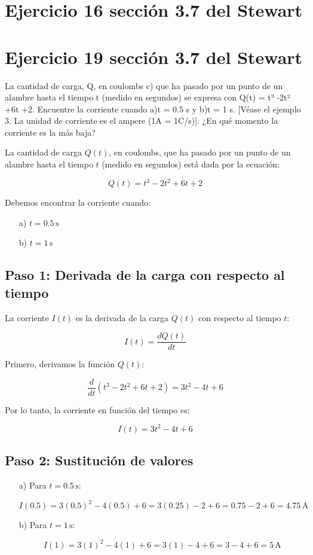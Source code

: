 \documentclass[11pt,letterpaper]{article}
\begin{document}
\section*{Ejercicio 16 sección 3.7 del Stewart}
\section*{Ejercicio 19 sección 3.7 del Stewart}
La cantidad de carga, Q, en coulombs c) que ha pasado por un punto de un alambre hasta el tiempo t (medido en segundos) se expresa con Q(t) = t³ -2t² +6t +2. Encuentre la corriente cuando a)t = 0.5 s y b)t = 1 s. [Véase el ejemplo 3. La unidad de corriente es el ampere
(1A = 1C/s)]. ¿En qué momento la corriente es la más baja?

La cantidad de carga \( Q(t) \), en coulombs, que ha pasado por un punto de un alambre hasta el tiempo \( t \) (medido en segundos) está dada por la ecuación:

\[
Q(t) = t^3 - 2t^2 + 6t + 2
\]

Debemos encontrar la corriente cuando:

\begin{itemize}
    \item[a)] \( t = 0.5 \, \text{s} \)
    \item[b)] \( t = 1 \, \text{s} \)
\end{itemize}

\subsection*{Paso 1: Derivada de la carga con respecto al tiempo}

La corriente \( I(t) \) es la derivada de la carga \( Q(t) \) con respecto al tiempo \( t \):

\[
I(t) = \frac{dQ(t)}{dt}
\]

Primero, derivamos la función \( Q(t) \):

\[
\frac{d}{dt} \left( t^3 - 2t^2 + 6t + 2 \right) = 3t^2 - 4t + 6
\]

Por lo tanto, la corriente en función del tiempo es:

\[
I(t) = 3t^2 - 4t + 6
\]

\subsection*{Paso 2: Sustitución de valores}

\begin{itemize}
    \item[a)] Para \( t = 0.5 \, \text{s} \):

    \[
    I(0.5) = 3(0.5)^2 - 4(0.5) + 6 = 3(0.25) - 2 + 6 = 0.75 - 2 + 6 = 4.75 \, \text{A}
    \]

    \item[b)] Para \( t = 1 \, \text{s} \):

    \[
    I(1) = 3(1)^2 - 4(1) + 6 = 3(1) - 4 + 6 = 3 - 4 + 6 = 5 \, \text{A}
    \]
\end{itemize}
\end{document}
